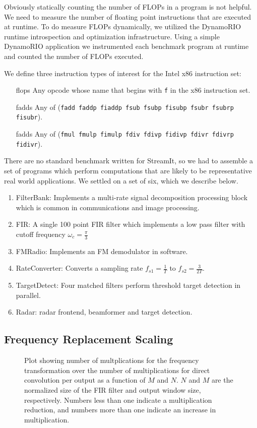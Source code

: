 Obviously statically counting the number of FLOPs in a program is not helpful. We 
need to measure the number of floating point instructions that are executed at runtime.
To do measure FLOPs dynamically, we utilized the DynamoRIO\cite{rio-webpage}
runtime introspection and optimization infrastructure. Using a simple DynamoRIO application 
we instrumented each benchmark program at runtime and counted the number of FLOPs executed.


We define three instruction types of interest for the Intel x86 instruction set:
\begin{itemize}
\item[flops] Any opcode whose name that begins with {\tt f} in the x86 instruction set.
\item[fadds] Any of ({\tt fadd faddp fiaddp fsub fsubp fisubp fsubr fsubrp fisubr}).
\item[fadds] Any of ({\tt fmul fmulp fimulp fdiv fdivp fidivp fdivr fdivrp fidivr}).
\end{itemize}

There are no standard benchmark written for StreamIt, so we had to assemble
a set of programs which perform computations that are likely to be representative
real world applications. We settled on a set of six, which we describe below.

\begin{enumerate}
\item FilterBank: Implements a multi-rate signal decomposition processing block which is common in communications and image processing.
\item FIR: A single 100 point FIR filter which implements a low pass filter with cutoff frequency $\omega_c=\frac{\pi}{3}$
\item FMRadio: Implements an FM demodulator in software.
\item RateConverter: Converts a sampling rate $f_{s1}=\frac{1}{T}$ to $f_{s2}=\frac{3}{2T}$.
\item TargetDetect: Four matched filters perform threshold target detection in parallel.
\item Radar: radar frontend, beamformer and target detection.
\end{enumerate}


\subsection{Frequency Replacement Scaling}
\begin{figure}
\center
\epsfxsize=3.0in
\caption{Plot showing number of multplications for the frequency transformation over the number of multiplications for direct convolution per output as a function of $M$ and $N$. $N$ and $M$ are the normalized size of the FIR filter and output window size, respectively. Numbers less than one indicate a multiplication reduction, and numbers more than one indicate an increase in multiplication.}
\label{fig:frequency-win}
\end{figure}

